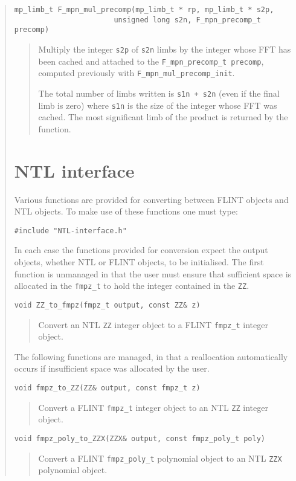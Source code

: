 \documentclass[a4paper,10pt]{article}
\newcommand{\code}{\lstinline}
\begin{document}
\begin{quote}
\begin{lstlisting}
mp_limb_t F_mpn_mul_precomp(mp_limb_t * rp, mp_limb_t * s2p, 
                       unsigned long s2n, F_mpn_precomp_t precomp)
\end{lstlisting}
\begin{quote}
Multiply the integer \code{s2p} of \code{s2n} limbs by the integer whose FFT has been cached and attached to the \code{F_mpn_precomp_t precomp}, computed previously with \code{F_mpn_mul_precomp_init}. 

The total number of limbs written is \code{s1n + s2n} (even if the final limb is zero) where \code{s1n} is the size of the integer whose FFT was cached. The most significant limb of the product is returned by the function.
\end{quote}
                      
\section{NTL interface}
Various functions are provided for converting between FLINT objects and NTL objects. To make use of these functions one must type:

\code{#include "NTL-interface.h"}

In each case the functions provided for conversion expect the output objects, whether NTL or FLINT objects, to be initialised. The first function is unmanaged in that the 
user must ensure that sufficient space is allocated in the \code{fmpz_t} to hold the integer contained in the \code{ZZ}.

\begin{lstlisting}
void ZZ_to_fmpz(fmpz_t output, const ZZ& z)
\end{lstlisting}
\begin{quote}
Convert an NTL \code{ZZ} integer object to a FLINT \code{fmpz_t} integer object.
\end{quote}

The following functions are managed, in that a reallocation automatically occurs if insufficient space was allocated by the user.

\begin{lstlisting}
void fmpz_to_ZZ(ZZ& output, const fmpz_t z)
\end{lstlisting}
\begin{quote}
Convert a FLINT \code{fmpz_t} integer object to an NTL \code{ZZ} integer object.
\end{quote}

\begin{lstlisting}
void fmpz_poly_to_ZZX(ZZX& output, const fmpz_poly_t poly)
\end{lstlisting}
\begin{quote}
Convert a FLINT \code{fmpz_poly_t} polynomial object to an NTL \code{ZZX} polynomial object.
\end{quote}


\end{quote}
\end{document}
